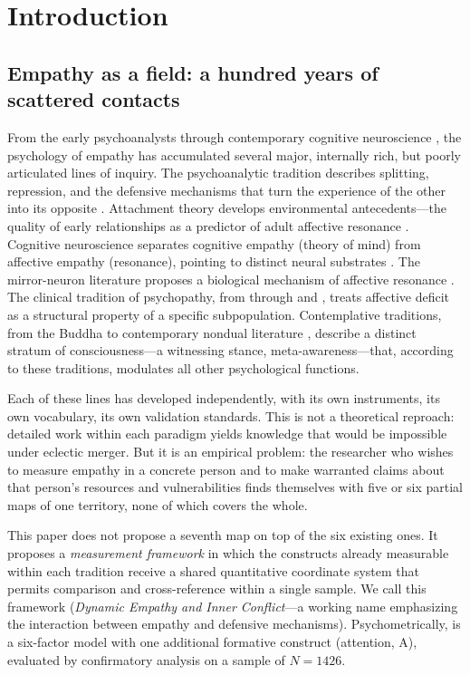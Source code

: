 \section{Introduction}
\label{sec:introduction}

\subsection{Empathy as a field: a hundred years of scattered contacts}

From the early psychoanalysts \citep{ferenczi1933, klein1946} through contemporary cognitive neuroscience \citep{decety2011, singer2014}, the psychology of empathy has accumulated several major, internally rich, but poorly articulated lines of inquiry. The psychoanalytic tradition describes splitting, repression, and the defensive mechanisms that turn the experience of the other into its opposite \citep{freud1915, fairbairn1952, bion1962, fonagy2002}. Attachment theory develops environmental antecedents---the quality of early relationships as a predictor of adult affective resonance \citep{bowlby1969, main1986, lyonsruth1999}. Cognitive neuroscience separates cognitive empathy (theory of mind) from affective empathy (resonance), pointing to distinct neural substrates \citep{shamaytsoory2011, decety2011}. The mirror-neuron literature proposes a biological mechanism of affective resonance \citep{rizzolatti2004, iacoboni2009}. The clinical tradition of psychopathy, from \citet{cleckley1941} through \citet{hare1991} and \citet{blair2013}, treats affective deficit as a structural property of a specific subpopulation. Contemplative traditions, from the Buddha to contemporary nondual literature \citep{godman1985, dunne2011, josipovic2014}, describe a distinct stratum of consciousness---a witnessing stance, meta-awareness---that, according to these traditions, modulates all other psychological functions.

Each of these lines has developed independently, with its own instruments, its own vocabulary, its own validation standards. This is not a theoretical reproach: detailed work within each paradigm yields knowledge that would be impossible under eclectic merger. But it is an empirical problem: the researcher who wishes to measure empathy in a concrete person and to make warranted claims about that person's resources and vulnerabilities finds themselves with five or six partial maps of one territory, none of which covers the whole.

This paper does not propose a seventh map on top of the six existing ones. It proposes a \emph{measurement framework} in which the constructs already measurable within each tradition receive a shared quantitative coordinate system that permits comparison and cross-reference within a single sample. We call this framework \DEIC{} (\textit{Dynamic Empathy and Inner Conflict}---a working name emphasizing the interaction between empathy and defensive mechanisms). Psychometrically, \DEIC{} is a six-factor model with one additional formative construct (attention, A), evaluated by confirmatory analysis on a sample of $N = 1426$.

